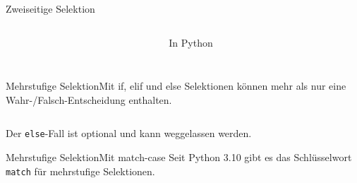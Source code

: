 \documentclass[xelatex,aspectratio=169]{beamer}
\begin{document}
\begin{frame}{Zweiseitige Selektion}
\begin{columns}[t]
\begin{column}{.3\linewidth}
    \end{column}
    \begin{column}{.3\linewidth}
      \begin{block}{In Python}
        \begin{minipage}[c][.7\textheight][c]{\textwidth}
          \inputminted{python}{src/algorithmus_zweiseitige_selektion.py}
        \end{minipage}
      \end{block}

    \end{column}
  \end{columns}

\end{frame}

\begin{frame}{Mehrstufige Selektion}{Mit if, elif und else}
  Selektionen können mehr als nur eine Wahr-/Falsch-Entscheidung enthalten.

  \inputminted{python}{src/algorithmus_mehrstufige_selektion.py}

  Der \texttt{else}-Fall ist optional und kann weggelassen werden.
\end{frame}


\begin{frame}{Mehrstufige Selektion}{Mit match-case}
  Seit Python 3.10 gibt es das Schlüsselwort \texttt{match} für mehrstufige Selektionen.

  \inputminted{python}{src/algorithmus_mehrstufige_selektion_match.py}

\end{frame}
\end{document}
